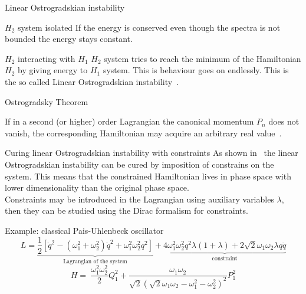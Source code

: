 \begin{frame}{Linear Ostrogradskian instability}
  \begin{alertblock}{$H_2$ system isolated}
    \vspace{0.5em}
    If the energy is conserved even though the spectra is not bounded the
    energy stays constant.
  \end{alertblock}
  \vspace{2.0em}
  \begin{alertblock}{$H_2$ interacting with $H_1$}
    \vspace{0.5em}
    $H_2$ system tries to reach the minimum of the Hamiltonian $H_2$ by giving
    energy to $H_1$ system. This is behaviour goes on endlessly. This is the
    so called \alert{Linear Ostrogradskian instability}~\cite{Kallosh08,
    Eliezer89}.
  \end{alertblock}
\end{frame}

\begin{frame}{Ostrogradsky Theorem}
  \begin{theorem}[Ostrogradsky] \vspace{0.5em}
    If in a second (or higher) order Lagrangian the canonical momentum $P_n$
    does not vanish, the corresponding Hamiltonian may acquire an arbitrary
    real value~\cite{Smilga17}.
  \end{theorem}
\end{frame}

\begin{frame}{Curing linear Ostrogradskian instability with constraints}
  As shown in~\cite{Chen13} the linear Ostrogradskian instability can be cured
  by imposition of constrains on the system. This means that the constrained
  Hamiltonian lives in phase space with lower dimensionality than the original
  phase space.\\\vspace{0.3em}
  Constraints may be introduced in the Lagrangian using auxiliary variables
  $\lambda$, then they can be studied using the Dirac formalism for
  constraints.\vspace{0.7em}

  \begin{block}{Example: classical Pais-Uhlenbeck oscillator}
    \vspace{0.2em}
    \begin{equation*}
      L =
      \underbrace{
        \frac{1}{2} \left[
        \ddot{q}^2 - (\omega_1^2 + \omega_2^2) \dot{q}^2 +
        \omega_1^2 \omega_2^2 q^2 \right]
      }_{\text{Lagrangian of the system}} +
      \underbrace{
        4 \omega_1^2\omega_2^2 q^2 \lambda (1+ \lambda) +
        2 \sqrt{2} \omega_1\omega_2 \lambda q \ddot{q}
      }_{\text{constraint}}
    \end{equation*}
    \vspace{0.2em}
    \begin{equation*}
      H =\ \frac{\omega_1^2\omega_2^2}{2} Q_1^2 +
      \frac{\omega_1\omega_2}{\sqrt{2} {\left(\sqrt{2} \omega_1\omega_2 -
      \omega_1^2 - \omega_2^2 \right)}^2} P_1^2
    \end{equation*}
  \end{block}
\end{frame}


